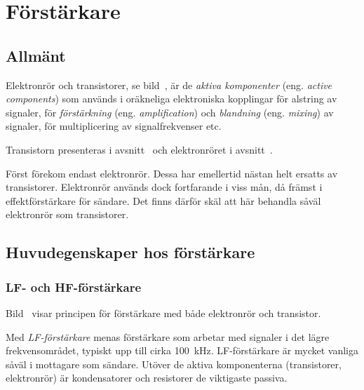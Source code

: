 \newpage
\section{Förstärkare}

\subsection{Allmänt}
\label{förstärkarsteg_allmänt}


Elektronrör och transistorer, se bild~, är de
\emph{aktiva komponenter} (eng. \emph{active components}) som används i
oräkneliga elektroniska kopplingar för alstring av signaler, för
\emph{förstärkning} (eng. \emph{amplification}) och \emph{blandning} (eng.
\emph{mixing}) av signaler, för multiplicering av signalfrekvenser etc.

Transistorn presenteras i avsnitt~ och elektronröret i
avsnitt~.

Först förekom endast elektronrör.
Dessa har emellertid nästan helt ersatts av transistorer.
Elektronrör används dock fortfarande i viss mån, då främst i effektförstärkare
för sändare.
Det finns därför skäl att här behandla såväl elektronrör som transistorer.

\subsection{Huvudegenskaper hos förstärkare}
\subsubsection{LF- och HF-förstärkare}


Bild~ visar principen för förstärkare med både
elektronrör och transistor.

Med \emph{LF-förstärkare} menas förstärkare som arbetar med signaler i det lägre
frekvensområdet, typiskt upp till cirka \qty{100}{\kilo\hertz}.
LF-förstärkare är mycket vanliga såväl i mottagare som sändare.
Utöver de aktiva komponenterna (transistorer, elektronrör) är kondensatorer
och resistorer de viktigaste passiva.


